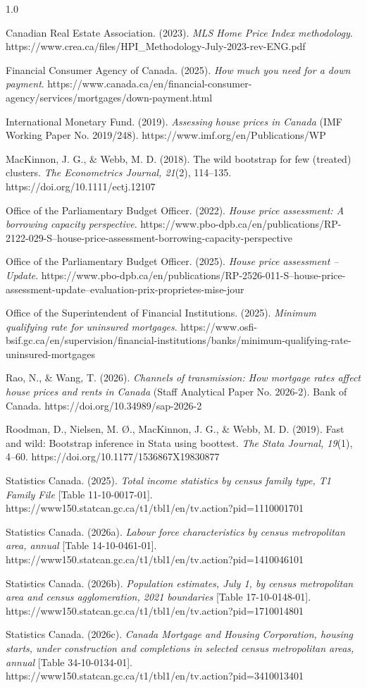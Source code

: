\documentclass[12pt]{article}
\newcommand{\refitem}[1]{\par\noindent\hangindent=0.5in\hangafter=1 #1\vspace{6pt}}
\begin{document}
\begin{spacing}{1.0}
\refitem{Canadian Real Estate Association. (2023). \textit{MLS Home Price Index methodology}. https://www.crea.ca/files/HPI\_Methodology-July-2023-rev-ENG.pdf}

\refitem{Financial Consumer Agency of Canada. (2025). \textit{How much you need for a down payment}. https://www.canada.ca/en/financial-consumer-agency/services/mortgages/down-payment.html}

\refitem{International Monetary Fund. (2019). \textit{Assessing house prices in Canada} (IMF Working Paper No. 2019/248). https://www.imf.org/en/Publications/WP}

\refitem{MacKinnon, J. G., \& Webb, M. D. (2018). The wild bootstrap for few (treated) clusters. \textit{The Econometrics Journal, 21}(2), 114--135. https://doi.org/10.1111/ectj.12107}

\refitem{Office of the Parliamentary Budget Officer. (2022). \textit{House price assessment: A borrowing capacity perspective}. https://www.pbo-dpb.ca/en/publications/RP-2122-029-S--house-price-assessment-borrowing-capacity-perspective}

\refitem{Office of the Parliamentary Budget Officer. (2025). \textit{House price assessment -- Update}. https://www.pbo-dpb.ca/en/publications/RP-2526-011-S--house-price-assessment-update--evaluation-prix-proprietes-mise-jour}

\refitem{Office of the Superintendent of Financial Institutions. (2025). \textit{Minimum qualifying rate for uninsured mortgages}. https://www.osfi-bsif.gc.ca/en/supervision/financial-institutions/banks/minimum-qualifying-rate-uninsured-mortgages}

\refitem{Rao, N., \& Wang, T. (2026). \textit{Channels of transmission: How mortgage rates affect house prices and rents in Canada} (Staff Analytical Paper No. 2026-2). Bank of Canada. https://doi.org/10.34989/sap-2026-2}

\refitem{Roodman, D., Nielsen, M. {\O}., MacKinnon, J. G., \& Webb, M. D. (2019). Fast and wild: Bootstrap inference in Stata using boottest. \textit{The Stata Journal, 19}(1), 4--60. https://doi.org/10.1177/1536867X19830877}

\refitem{Statistics Canada. (2025). \textit{Total income statistics by census family type, T1 Family File} [Table 11-10-0017-01]. https://www150.statcan.gc.ca/t1/tbl1/en/tv.action?pid=1110001701}

\refitem{Statistics Canada. (2026a). \textit{Labour force characteristics by census metropolitan area, annual} [Table 14-10-0461-01]. https://www150.statcan.gc.ca/t1/tbl1/en/tv.action?pid=1410046101}

\refitem{Statistics Canada. (2026b). \textit{Population estimates, July 1, by census metropolitan area and census agglomeration, 2021 boundaries} [Table 17-10-0148-01]. https://www150.statcan.gc.ca/t1/tbl1/en/tv.action?pid=1710014801}

\refitem{Statistics Canada. (2026c). \textit{Canada Mortgage and Housing Corporation, housing starts, under construction and completions in selected census metropolitan areas, annual} [Table 34-10-0134-01]. https://www150.statcan.gc.ca/t1/tbl1/en/tv.action?pid=3410013401}

\end{spacing}
\end{document}
